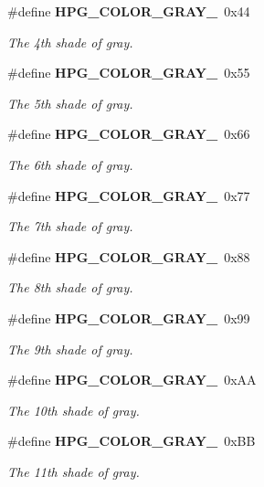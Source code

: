\begin{CompactItemize}
\#define {\bf HPG\_\-COLOR\_\-GRAY\_}\ 0x44
\begin{CompactList}\small\item\em The 4th shade of gray.\item\end{CompactList}\item 
\#define {\bf HPG\_\-COLOR\_\-GRAY\_}\ 0x55
\begin{CompactList}\small\item\em The 5th shade of gray.\item\end{CompactList}\item 
\#define {\bf HPG\_\-COLOR\_\-GRAY\_}\ 0x66
\begin{CompactList}\small\item\em The 6th shade of gray.\item\end{CompactList}\item 
\#define {\bf HPG\_\-COLOR\_\-GRAY\_}\ 0x77
\begin{CompactList}\small\item\em The 7th shade of gray.\item\end{CompactList}\item 
\#define {\bf HPG\_\-COLOR\_\-GRAY\_}\ 0x88
\begin{CompactList}\small\item\em The 8th shade of gray.\item\end{CompactList}\item 
\#define {\bf HPG\_\-COLOR\_\-GRAY\_}\ 0x99
\begin{CompactList}\small\item\em The 9th shade of gray.\item\end{CompactList}\item 
\#define {\bf HPG\_\-COLOR\_\-GRAY\_}\ 0x\-AA
\begin{CompactList}\small\item\em The 10th shade of gray.\item\end{CompactList}\item 
\#define {\bf HPG\_\-COLOR\_\-GRAY\_}\ 0x\-BB
\begin{CompactList}\small\item\em The 11th shade of gray.\item\end{CompactList}\item 

\end{CompactItemize}

